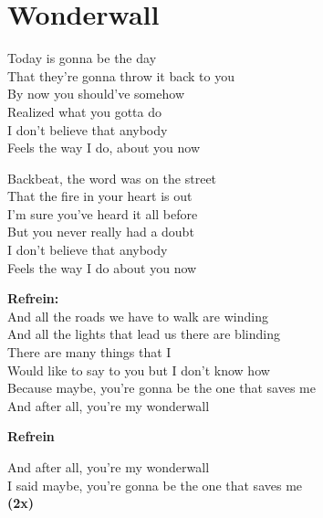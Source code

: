 \section{Wonderwall}
Today is gonna be the day\\
That they're gonna throw it back to you\\
By now you should've somehow\\
Realized what you gotta do\\
I don't believe that anybody\\
Feels the way I do, about you now

Backbeat, the word was on the street\\
That the fire in your heart is out\\
I'm sure you've heard it all before\\
But you never really had a doubt\\
I don't believe that anybody\\
Feels the way I do about you now

\textbf{Refrein:}\\
And all the roads we have to walk are winding\\
And all the lights that lead us there are blinding\\
There are many things that I\\
Would like to say to you but I don't know how\\
Because maybe, you're gonna be the one that saves me\\
And after all, you're my wonderwall

\textbf{Refrein}

And after all, you're my wonderwall\\
I said maybe, you're gonna be the one that saves me\\
\textbf{(2x)}